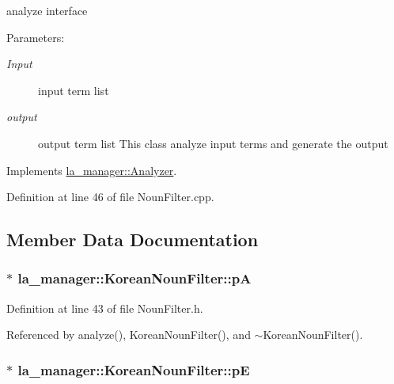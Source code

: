 analyze interface 

\begin{Desc}
\item[Parameters:]
\begin{description}
\item[{\em Input}]input term list \item[{\em output}]output term list This class analyze input terms and generate the output \end{description}
\end{Desc}


Implements \hyperlink{classla__manager_1_1Analyzer_a096ba4b2faeaa0f3938d7b826ab1c78}{la\_\-manager::Analyzer}.

Definition at line 46 of file NounFilter.cpp.

\subsection{Member Data Documentation}
\hypertarget{classla__manager_1_1KoreanNounFilter_479d20d289d8d2bef499469d43a2c2f8}{
\subsubsection[{pA}]{$\ast$ {\bf la\_\-manager::KoreanNounFilter::pA}}}
\label{classla__manager_1_1KoreanNounFilter_479d20d289d8d2bef499469d43a2c2f8}




Definition at line 43 of file NounFilter.h.

Referenced by analyze(), KoreanNounFilter(), and $\sim$KoreanNounFilter().\hypertarget{classla__manager_1_1KoreanNounFilter_48a4995bc41a46eed59f1362bf2ff1af}{
\subsubsection[{pE}]{$\ast$ {\bf la\_\-manager::KoreanNounFilter::pE}}}
\label{classla__manager_1_1KoreanNounFilter_48a4995bc41a46eed59f1362bf2ff1af}




